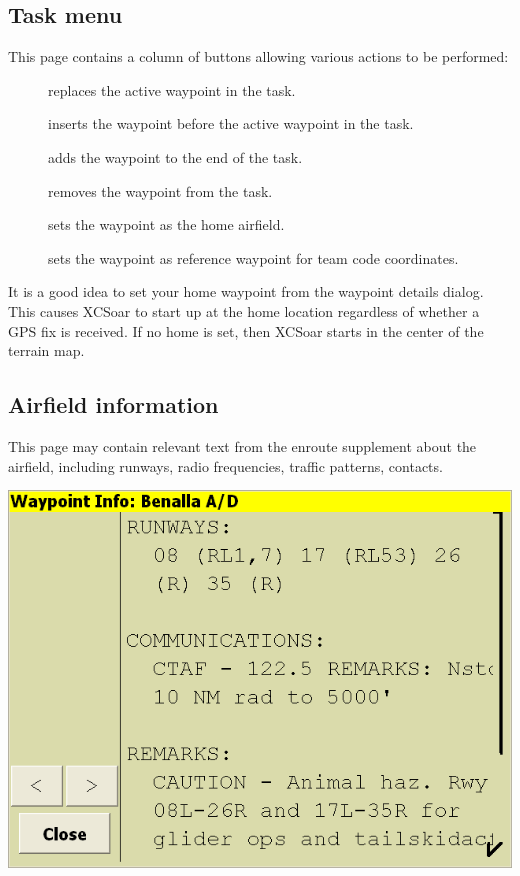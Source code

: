 \documentclass[a4paper,12pt]{refrep}
\begin{document}
\subsection*{Task menu}  
This page contains a column of buttons allowing various actions to be performed:
\begin{description}
\item[] replaces the active waypoint in the task.
\item[] inserts the waypoint before the active waypoint in
  the task.
\item[] adds the waypoint to the end of the task.
\item[] removes the waypoint from the task.
\item[] sets the waypoint as the home airfield.
\item[] sets the waypoint as reference waypoint for
  team code coordinates.

\end{description}

It is a good idea to set your home waypoint from the waypoint details
dialog. This causes XCSoar to start up at the home location regardless
of whether a GPS fix is received.  If no home is set, then XCSoar
starts in the center of the terrain map.

\subsection*{Airfield information}
This page may contain relevant text from the enroute supplement about
the airfield, including runways, radio frequencies, traffic patterns,
contacts.
\begin{center}
\includegraphics[angle=0,width=\linewidth,keepaspectratio='true']{figures/dialog-waypointdetails1.png}
\end{center}
\end{document}
